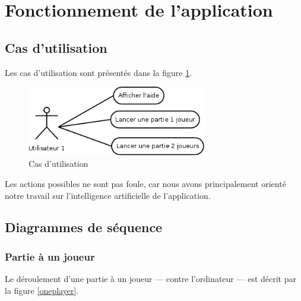 \documentclass[11pt,a4paper,titlepage,french]{article}
\begin{document}
	\section{Fonctionnement de l'application}

		\subsection{Cas d'utilisation}
			Les cas d'utilisation sont présentés dans la figure \ref{use case}.

			\begin{figure}[hbt]
				\begin{center}
					\includegraphics[width=0.7\textwidth]{./usecase.png}
				\end{center}
				\caption{Cas d'utilisation}
				\label{use case}
			\end{figure}

		Les actions possibles ne sont pas foule, car nous avons principalement orienté notre travail sur l'intelligence artificielle de l'application.

		\subsection{Diagrammes de séquence}

			\subsubsection{Partie à un joueur}
				Le déroulement d'une partie à un joueur --- contre l'ordinateur --- est décrit par la figure \ref{oneplayer}.
\end{document}
